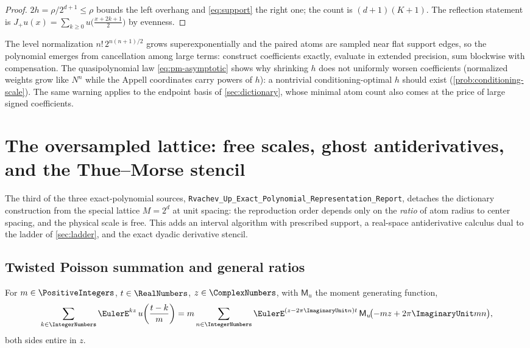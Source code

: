 \documentclass[11pt,oneside]{article}
\numberwithin{equation}{section}
\theoremstyle{definition}
\theoremstyle{remark}
\newcommand{\MM}{\mathsf M}
\begin{document}
\begin{proof}
$2h=\rho/2^{d+1}\le\rho$ bounds the left overhang and
\eqref{eq:support} the right one; the count is
$(d+1)(K+1)$.  The reflection statement is
$J_+u(x)=\sum_{k\ge0}u\bigl(\tfrac{x+2k+1}2\bigr)$ by evenness.
\end{proof}

\begin{remark}[Conditioning]
The level normalization $n!\,2^{n(n+1)/2}$ grows superexponentially
and the paired atoms are sampled near flat support edges, so the
polynomial emerges from cancellation among large terms: construct
coefficients exactly, evaluate in extended precision, sum blockwise
with compensation.  The quasipolynomial law
\eqref{eq:pm-asymptotic} shows why shrinking $h$ does not uniformly
worsen coefficients (normalized weights grow like $N^{n}$ while the
Appell coordinates carry powers of $h$): a nontrivial
conditioning-optimal $h$ should exist
(\cref{prob:conditioning-scale}).  The same warning applies to the
endpoint basis of \cref{sec:dictionary}, whose minimal atom count
also comes at the price of large signed coefficients.
\end{remark}


\section{The oversampled lattice: free scales, ghost antiderivatives,
and the Thue--Morse stencil}
\label{sec:lattice}

The third of the three exact-polynomial sources,
\nolinkurl{Rvachev_Up_Exact_Polynomial_Representation_Report}, detaches the
dictionary construction from
the special lattice $M=2^{d}$ at unit spacing: the reproduction order
depends only on the \emph{ratio} of atom radius to center spacing,
and the physical scale is free.  This adds an interval algorithm with
prescribed support, a real-space antiderivative calculus dual to the
ladder of \cref{sec:ladder}, and the exact dyadic derivative stencil.

\subsection{Twisted Poisson summation and general ratios}

\begin{lemma}
\label{lem:twisted-poisson}
For $m\in\PositiveIntegers$, $t\in\RealNumbers$, $z\in\ComplexNumbers$, with
$\MM_u$ the moment generating function,
\begin{equation}
 \sum_{k\in\IntegerNumbers}\EulerE^{kz}\,u\!\left(\frac{t-k}{m}\right)
 =m\sum_{n\in\IntegerNumbers}\EulerE^{(z-2\pi\ImaginaryUnit n)t}\,
 \MM_u\!\bigl(-mz+2\pi\ImaginaryUnit mn\bigr),
 \label{eq:twisted-poisson}
\end{equation}
both sides entire in $z$.
\end{lemma}
\end{document}
